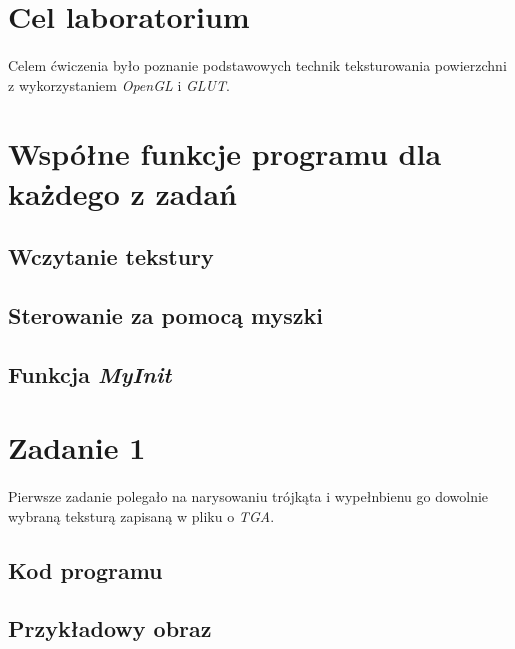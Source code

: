 \documentclass[wide,a4paper,titlepage,12pt] {article}
\begin{document}

\section{Cel laboratorium}
\paragraph{}
Celem ćwiczenia było poznanie podstawowych technik teksturowania powierzchni z wykorzystaniem \textit{OpenGL} i \textit{GLUT}.

\section{Współne funkcje programu dla każdego z zadań}
\subsection{Wczytanie tekstury}
\subsection{Sterowanie za pomocą myszki}
\subsection{Funkcja \textit{MyInit}}

\newpage
\section{Zadanie 1}
\paragraph{} 
Pierwsze zadanie polegało na narysowaniu trójkąta i wypełnbienu go dowolnie wybraną teksturą zapisaną w pliku o \textit{TGA}.
\subsection{Kod programu}
\subsection{Przykładowy obraz}
\end{document}
